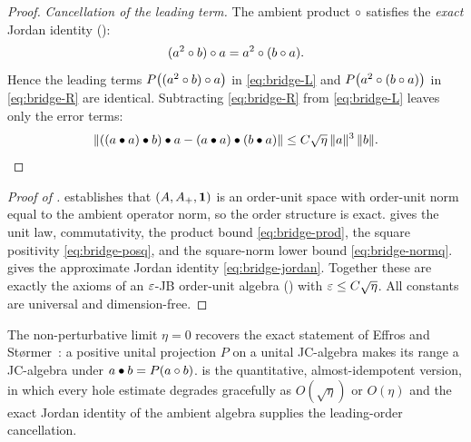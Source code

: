 \begin{proof}
\emph{Cancellation of the leading term.} The ambient product $\circ$ satisfies the
\emph{exact} Jordan identity ():
\[
  (a^2\circ b)\circ a=a^2\circ(b\circ a).
\]
Hence the leading terms $P\big((a^2\circ b)\circ a\big)$ in \eqref{eq:bridge-L} and
$P\big(a^2\circ(b\circ a)\big)$ in \eqref{eq:bridge-R} are identical. Subtracting
\eqref{eq:bridge-R} from \eqref{eq:bridge-L} leaves only the error terms:
\[
  \lVert ((a\bullet a)\bullet b)\bullet a-(a\bullet a)\bullet(b\bullet a) \rVert
   \le C\sqrt\eta\,\lVert a \rVert^3\,\lVert b \rVert. \qedhere
\]
\end{proof}

\begin{proof}[Proof of ]
 establishes that $(A,A_+,\mathbf{1})$ is an order-unit
space with order-unit norm equal to the ambient operator norm, so the order
structure is exact.  gives the unit law, commutativity,
the product bound \eqref{eq:bridge-prod}, the square positivity
\eqref{eq:bridge-posq}, and the square-norm lower bound \eqref{eq:bridge-normq}.
 gives the approximate Jordan identity
\eqref{eq:bridge-jordan}. Together these are exactly the axioms of an
$\varepsilon$-JB order-unit algebra () with $\varepsilon\le C\sqrt\eta$. All
constants are universal and dimension-free.
\end{proof}

\begin{remark}\label{rem:bridge-exact}
The non-perturbative limit $\eta=0$ recovers the exact statement of Effros and
St{\o}rmer~\cite{EffrosStormer1979}: a positive unital projection $P$ on a
unital JC-algebra makes its range a JC-algebra under
$a\bullet b=P(a\circ b)$.  is the quantitative,
almost-idempotent version, in which every hole estimate degrades gracefully as
$O(\sqrt\eta)$ or $O(\eta)$ and the exact Jordan identity of the ambient algebra
supplies the leading-order cancellation.
\end{remark}

